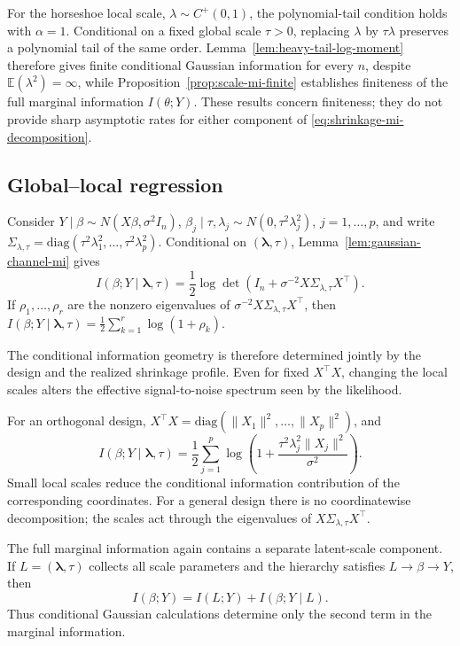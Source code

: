 \documentclass[11pt]{article}
\theoremstyle{plain}
\theoremstyle{definition}
\theoremstyle{remark}
\newcommand{\E}{\mathbb{E}}
\newcommand{\diag}{\mathrm{diag}}
\begin{document}
For the horseshoe local scale, \(\lambda\sim C^+(0,1)\), the polynomial-tail condition holds with \(\alpha=1\). Conditional on a fixed global scale \(\tau>0\), replacing \(\lambda\) by \(\tau\lambda\) preserves a polynomial tail of the same order. Lemma~\ref{lem:heavy-tail-log-moment} therefore gives finite conditional Gaussian information for every \(n\), despite \(\E(\lambda^2)=\infty\), while Proposition~\ref{prop:scale-mi-finite} establishes finiteness of the full marginal information \(I(\theta;Y)\). These results concern finiteness; they do not provide sharp asymptotic rates for either component of \eqref{eq:shrinkage-mi-decomposition}.

\subsection{Global--local regression}
\label{subsec:multivariate-shrinkage}

Consider \(Y\mid\beta\sim N(X\beta,\sigma^2I_n)\), \(\beta_j\mid\tau,\lambda_j\sim N(0,\tau^2\lambda_j^2)\), \(j=1,\ldots,p\), and write \(\Sigma_{\lambda,\tau}=\diag(\tau^2\lambda_1^2,\ldots,\tau^2\lambda_p^2)\). Conditional on \((\boldsymbol\lambda,\tau)\), Lemma~\ref{lem:gaussian-channel-mi} gives
\begin{equation*}
	I(\beta;Y\mid\boldsymbol\lambda,\tau)
	=
	\frac12
	\log\det\left(
	I_n+\sigma^{-2}X\Sigma_{\lambda,\tau}X^\top
	\right).
\end{equation*}
If \(\rho_1,\ldots,\rho_r\) are the nonzero eigenvalues of \(\sigma^{-2}X\Sigma_{\lambda,\tau}X^\top\), then \(I(\beta;Y\mid\boldsymbol\lambda,\tau)=\frac12\sum_{k=1}^r\log(1+\rho_k)\).

The conditional information geometry is therefore determined jointly by the design and the realized shrinkage profile. Even for fixed \(X^\top X\), changing the local scales alters the effective signal-to-noise spectrum seen by the likelihood.

For an orthogonal design, \(X^\top X=\diag(\|X_1\|^2,\ldots,\|X_p\|^2)\), and
\[
I(\beta;Y\mid\boldsymbol\lambda,\tau)
=
\frac12
\sum_{j=1}^p
\log\left(
1+\frac{\tau^2\lambda_j^2\|X_j\|^2}{\sigma^2}
\right).
\]
Small local scales reduce the conditional information contribution of the corresponding coordinates. For a general design there is no coordinatewise decomposition; the scales act through the eigenvalues of \(X\Sigma_{\lambda,\tau}X^\top\).

The full marginal information again contains a separate latent-scale component. If \(L=(\boldsymbol\lambda,\tau)\) collects all scale parameters and the hierarchy satisfies \(L\to\beta\to Y\), then
\begin{equation}
	\label{eq:global-local-mi-decomp}
	I(\beta;Y)
	=
	I(L;Y)
	+
	I(\beta;Y\mid L).
\end{equation}
Thus conditional Gaussian calculations determine only the second term in the marginal information.
\end{document}
